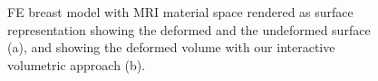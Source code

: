 \documentclass[journal]{vgtc}                %
\begin{document}
\begin{figure}
    \centering 
    \caption{FE breast model with MRI material space rendered as surface representation showing the deformed and the undeformed surface (a), and showing the deformed volume with our interactive volumetric approach (b).}
    \label{fig:breast}
\end{figure}
\end{document}
